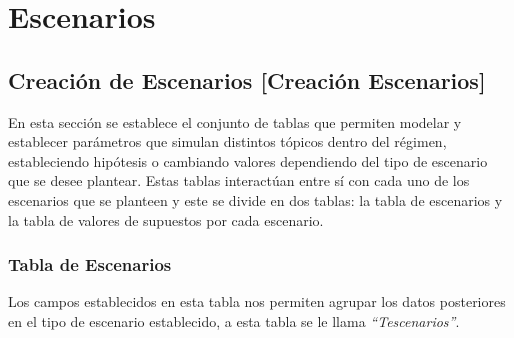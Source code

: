 \documentclass[
  letterpaper,
  DIV=11,
  numbers=noendperiod]{scrreprt}
\begin{document}

\hypertarget{escenarios}{%
\chapter{Escenarios}\label{escenarios}}

\hypertarget{creaciuxf3n-de-escenarios-creaciuxf3n-escenarios}{%
\section{Creación de Escenarios {[}Creación
Escenarios{]}}\label{creaciuxf3n-de-escenarios-creaciuxf3n-escenarios}}

En esta sección se establece el conjunto de tablas que permiten modelar
y establecer parámetros que simulan distintos tópicos dentro del
régimen, estableciendo hipótesis o cambiando valores dependiendo del
tipo de escenario que se desee plantear. Estas tablas interactúan entre
sí con cada uno de los escenarios que se planteen y este se divide en
dos tablas: la tabla de escenarios y la tabla de valores de supuestos
por cada escenario.

\hypertarget{tabla-de-escenarios}{%
\subsection{Tabla de Escenarios}\label{tabla-de-escenarios}}

Los campos establecidos en esta tabla nos permiten agrupar los datos
posteriores en el tipo de escenario establecido, a esta tabla se le
llama \emph{``Tescenarios''}.
\end{document}
